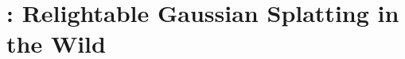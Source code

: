 \chapter{\lumigauss: Relightable Gaussian Splatting in the Wild}

\label{chap:lumigauss}

\lumigaussteaserfigure









